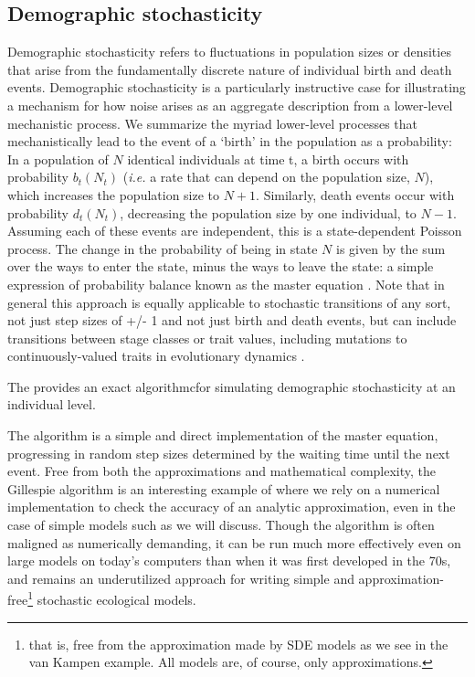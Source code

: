 \documentclass[
  authoryear,
  preprint,
  3p]{elsarticle}
\begin{document}
\subsection{Demographic stochasticity}\label{demographic-stochasticity}

Demographic stochasticity refers to fluctuations in population sizes or
densities that arise from the fundamentally discrete nature of
individual birth and death events. Demographic stochasticity is a
particularly instructive case for illustrating a mechanism for how noise
arises as an aggregate description from a lower-level mechanistic
process. We summarize the myriad lower-level processes that
mechanistically lead to the event of a `birth' in the population as a
probability: In a population of \(N\) identical individuals at time t, a
birth occurs with probability \(b_t(N_t)\) (\emph{i.e.} a rate that can
depend on the population size, \(N\)), which increases the population
size to \(N+1\). Similarly, death events occur with probability
\(d_t(N_t)\), decreasing the population size by one individual, to
\(N-1\). Assuming each of these events are independent, this is a
state-dependent Poisson process. The change in the probability of being
in state \(N\) is given by the sum over the ways to enter the state,
minus the ways to leave the state: a simple expression of probability
balance known as the master equation \citep{vanKampen2007}. Note that in
general this approach is equally applicable to stochastic transitions of
any sort, not just step sizes of +/- 1 and not just birth and death
events, but can include transitions between stage classes or trait
values, including mutations to continuously-valued traits in
evolutionary dynamics \citep[e.g.][]{Boettiger2010}.

The \citet{Gillespie1977} provides an exact algorithmcfor simulating
demographic stochasticity at an individual level.

The algorithm is a simple and direct implementation of the master
equation, progressing in random step sizes determined by the waiting
time until the next event. Free from both the approximations and
mathematical complexity, the Gillespie algorithm is an interesting
example of where we rely on a numerical implementation to check the
accuracy of an analytic approximation, even in the case of simple models
such as we will discuss. Though the algorithm is often maligned as
numerically demanding, it can be run much more effectively even on large
models on today's computers than when it was first developed in the 70s,
and remains an underutilized approach for writing simple and
approximation-free\footnote{that is, free from the approximation made by
  SDE models as we see in the van Kampen example. All models are, of
  course, only approximations.} stochastic ecological models.
\end{document}
